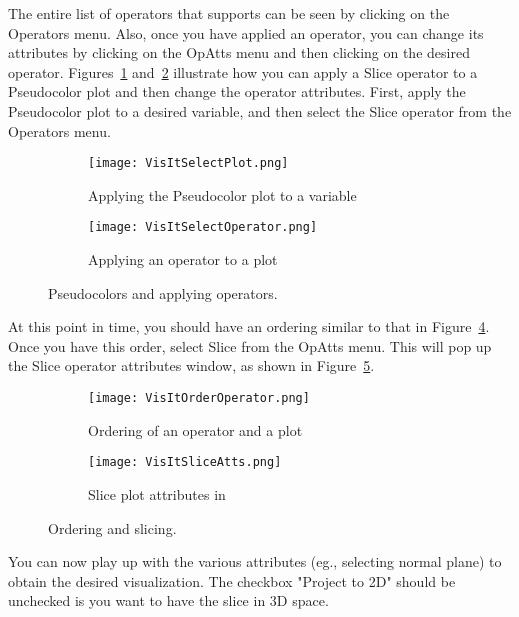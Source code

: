 The entire list of operators that \Visit supports can be seen by
clicking on the Operators menu. Also, once you have applied an
operator, you can change its attributes by clicking on the OpAtts menu
and then clicking on the desired operator.
Figures~\ref{VisItSelectPlot} and~\ref{VisItSelectOperator} illustrate
how you can apply a Slice operator to a Pseudocolor plot and then
change the operator attributes.  First, apply the Pseudocolor plot to
a desired variable, and then select the Slice operator from the
Operators menu.
\begin{figure}[htbp!]
  \begin{subfigure}[b]{0.5\textwidth}
    \centering 
    \texttt{[image: VisItSelectPlot.png]}
    \caption{Applying the Pseudocolor plot to a variable}
    \label{VisItSelectPlot}
  \end{subfigure}
  \begin{subfigure}[b]{0.5\textwidth}
    \centering 
    \texttt{[image: VisItSelectOperator.png]}
    \caption{Applying an operator to a plot}
    \label{VisItSelectOperator}
  \end{subfigure}
  \caption{Pseudocolors and applying operators.}
  \label{ucf:fig1}
\end{figure}

At this point in time, you should have an ordering similar to that in
Figure~\ref{VisItOrderOperator}.  Once you have this order, select
Slice from the OpAtts menu. This will pop up the Slice operator
attributes window, as shown in Figure~\ref{VisItSliceAtts}.
\begin{figure}[htbp!]
  \begin{subfigure}[b]{0.5\textwidth}
    \centering
    \texttt{[image: VisItOrderOperator.png]}
    \caption{Ordering of an operator and a plot}
    \label{VisItOrderOperator}
  \end{subfigure}
  \begin{subfigure}[b]{0.5\textwidth}
    \centering
    \texttt{[image: VisItSliceAtts.png]}
    \caption{Slice plot attributes in \Visit}
    \label{VisItSliceAtts}
  \end{subfigure}
  \caption{Ordering and slicing.}
  \label{ucf:fig2}
\end{figure}

You can now play up with the various attributes (eg., selecting normal
plane) to obtain the desired visualization. The checkbox "Project to
2D" should be unchecked is you want to have the slice in 3D space.

